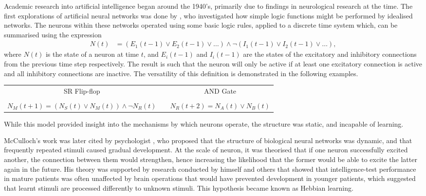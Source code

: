 Academic research into artificial intelligence began around the 1940's,
primarily due to findings in neurological research at the time.
The first explorations of artificial neural networks was done by
\cite{McCulloch:1943:Logical}, who investigated how simple logic functions
might be performed by idealised networks.
The neurons within these networks operated using some basic logic rules, applied
to a discrete time system which, can be summarised using the expression
\begin{align*}
    N(t) &= (E_1(t-1) \vee E_2(t-1) \vee \dots)
        \wedge \neg(I_1(t-1) \vee I_2(t-1) \vee \dots),
\end{align*}
where $N(t)$ is the state of a neuron at time $t$, and $E_i(t-1)$ and $I_i(t-1)$
are the states of the excitatory and inhibitory connections from the previous
time step respectively.
The result is such that the neuron will only be active if at least one
excitatory connection is active and all inhibitory connections are inactive.
The versatility of this definition is demonstrated in the following examples.
\begin{center}
    \begin{tabular}{ccc}
        SR Flip-flop & & AND Gate\\
         & & \\
        $\displaystyle N_M(t+1) = (N_S(t) \vee N_M(t)) \wedge\neg N_R(t)$ &
        &
        $\displaystyle N_R(t+2) = N_A(t) \vee N_B(t)$\\
    \end{tabular}
    \parbox{0.9\textwidth}{%
    }
\end{center}
While this model provided insight into the mechanisms by which neurons operate,
the structure was static, and incapable of learning.

McCulloch's work was later cited by psychologist \cite{Hebb:1949:Organization},
who proposed that the structure of biological neural networks was dynamic, and
that frequently repeated stimuli caused gradual development.
At the scale of neuron, it was theorised that if one neuron successfully
excited another, the connection between them would strengthen, hence
increasing the likelihood that the former would be able to excite the latter
again in the future.
His theory was supported by research conducted by himself and others that showed
that intelligence-test performance in mature patients was often unaffected by
brain operations that would have prevented development in younger patients,
which suggested that learnt stimuli are processed differently to unknown
stimuli.
This hypothesis became known as Hebbian learning.

